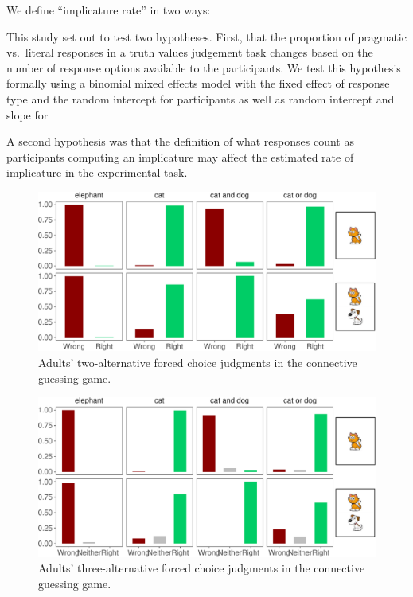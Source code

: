 \documentclass[floatsintext,man]{apa6}
\theoremstyle{definition}
\theoremstyle{definition}
\theoremstyle{definition}
\theoremstyle{remark}
\begin{document}
We define \enquote{implicature rate} in two ways:

This study set out to test two hypotheses. First, that the proportion of
pragmatic vs.~literal responses in a truth values judgement task changes
based on the number of response options available to the participants.
We test this hypothesis formally using a binomial mixed effects model
with the fixed effect of response type and the random intercept for
participants as well as random intercept and slope for

A second hypothesis was that the definition of what responses count as
participants computing an implicature may affect the estimated rate of
implicature in the experimental task.

\begin{figure}[t]

{\centering \includegraphics{writeup_files/figure-latex/binaryPlot-1} 

}

\caption{Adults' two-alternative forced choice judgments in the connective guessing game.}\label{fig:binaryPlot}
\end{figure}

\begin{figure}[t]

{\centering \includegraphics{writeup_files/figure-latex/ternaryPlot-1} 

}

\caption{Adults' three-alternative forced choice judgments in the connective guessing game.}\label{fig:ternaryPlot}
\end{figure}
\end{document}
